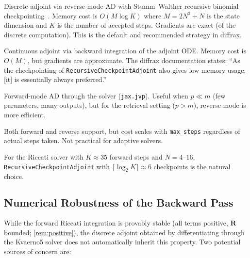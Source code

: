 \documentclass[11pt,a4paper]{article}
\newcommand{\mat}[1]{\mathbf{#1}}
\theoremstyle{definition}
\begin{document}
\begin{description}[style=nextline, leftmargin=2em]
  \item[\texttt{RecursiveCheckpointAdjoint}~(recommended)]
    Discrete adjoint via reverse-mode AD with Stumm--Walther recursive
    binomial checkpointing~\cite{griewank2008}.  Memory cost is
    $O(M \log K)$ where $M = 2N^2 + N$ is the state dimension and
    $K$ is the number of accepted steps.  Gradients are exact (of the
    discrete computation).  This is the default and recommended strategy
    in diffrax.

  \item[\texttt{BacksolveAdjoint}~(not recommended)]
    Continuous adjoint via backward integration of the adjoint ODE.
    Memory cost is $O(M)$, but gradients are approximate.  The diffrax
    documentation states: ``As the checkpointing of
    \texttt{RecursiveCheckpointAdjoint} also gives low memory usage,
    [it] is essentially always preferred.''

  \item[\texttt{ForwardMode}]
    Forward-mode AD through the solver (\texttt{jax.jvp}).  Useful
    when $p \ll m$ (few parameters, many outputs), but for the
    retrieval setting ($p > m$), reverse mode is more efficient.

  \item[\texttt{DirectAdjoint}]
    Both forward and reverse support, but cost scales with
    \texttt{max\_steps} regardless of actual steps taken.  Not practical
    for adaptive solvers.
\end{description}

For the Riccati solver with $K \approx 35$ forward steps and
$N = 4$--$16$, \texttt{RecursiveCheckpointAdjoint} with
$\lceil\log_2 K\rceil \approx 6$ checkpoints is the natural choice.

\subsection{Numerical Robustness of the Backward Pass}
\label{sec:adjoint-robustness}

While the forward Riccati integration is provably stable (all terms
positive, $\mat{R}$ bounded; \cref{rem:positive}), the discrete adjoint
obtained by differentiating through the Kvaerno5 solver does not
automatically inherit this property.  Two potential sources of concern
are:
\end{document}
